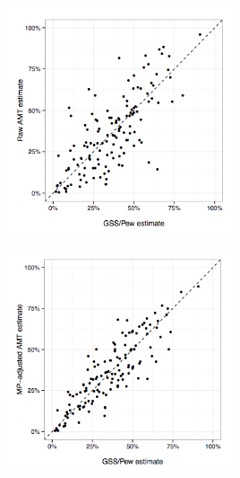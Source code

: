 \documentclass[aspectratio=169]{beamer}
\begin{document}
\begin{frame}

\begin{center}
\includegraphics[width=0.5\textwidth]{figures/goel_non-representative_2016_fig1a}
\end{center}

\end{frame}
\begin{frame}

\begin{center}
\includegraphics[width=0.5\textwidth]{figures/goel_non-representative_2016_fig2a}
\end{center}

\end{frame}
\end{document}
